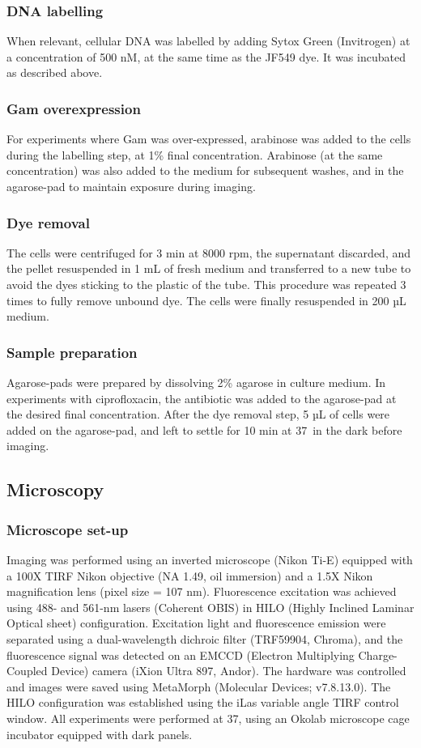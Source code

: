 \subsubsection*{DNA labelling}
When relevant, cellular DNA was labelled by adding Sytox Green (Invitrogen) at a concentration of 500 nM, at the same time as the JF549 dye. It was incubated as described above.
\subsubsection*{Gam overexpression}
For experiments where Gam was over-expressed, arabinose was added to the cells during the labelling step, at 1\% final concentration. Arabinose (at the same concentration) was also added to the medium for subsequent washes, and in the agarose-pad to maintain exposure during imaging.
\subsubsection*{Dye removal}
The cells were centrifuged for 3 min at 8000 rpm, the supernatant discarded, and the pellet resuspended in 1 mL of fresh medium and transferred to a new tube to avoid the dyes sticking to the plastic of the tube. This procedure was repeated 3 times to fully remove unbound dye. The cells were finally resuspended in 200 µL medium.
\subsubsection*{Sample preparation}
Agarose-pads were prepared by dissolving 2\% agarose in culture medium. In experiments with ciprofloxacin, the antibiotic was added to the agarose-pad at the desired final concentration. After the dye removal step, 5 µL of cells were added on the agarose-pad, and left to settle for 10 min at 37\celsius\ in the dark before imaging.

\subsection*{Microscopy}
\subsubsection*{Microscope set-up}
Imaging was performed using an inverted microscope (Nikon Ti-E) equipped with a 100X TIRF Nikon objective (NA 1.49, oil immersion) and a 1.5X Nikon magnification lens (pixel size = 107 nm). Fluorescence excitation was achieved using 488- and 561-nm lasers (Coherent OBIS) in HILO (Highly Inclined Laminar Optical sheet) configuration. Excitation light and fluorescence emission were separated using a dual-wavelength dichroic filter (TRF59904, Chroma), and the fluorescence signal was detected on an EMCCD (Electron Multiplying Charge-Coupled Device) camera (iXion Ultra 897, Andor). The hardware was controlled and images were saved using MetaMorph (Molecular Devices; v7.8.13.0). The HILO configuration was established using the iLas variable angle TIRF control window. All experiments were performed at 37\celsius, using an Okolab microscope cage incubator equipped with dark panels.

